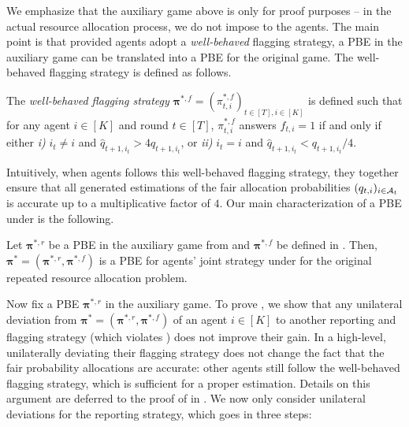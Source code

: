 We emphasize that the auxiliary game above is only for proof purposes -- in the actual resource allocation process, we do not impose  to the agents. The main point is that provided agents adopt a \textit{well-behaved} flagging strategy, a PBE in the auxiliary game can be translated into a PBE for the original game. The well-behaved flagging strategy is defined as follows.
\begin{definition}\label{def:well-behaved flagging}
The \textit{well-behaved flagging strategy} $\bm \pi^{\ast,f}=(\pi_{t,i}^{\ast,f})_{t\in [T],i\in [K]}$ is defined such that for any agent $i\in[K]$ and round $t\in[T]$, $\pi_{t,i}^{\ast,f}$ answers $f_{t,i}=1$ if and only if either \textit{i)} $i_t\neq i$ and $\hat q_{t+1,i_t}>4q_{t+1,i_t}$, or \textit{ii)} $i_t=i$ and $\hat q_{t+1,i_t}<q_{t+1,i_t}/4$.
\end{definition}

Intuitively, when agents follows this well-behaved flagging strategy, they together ensure that all generated estimations of the fair allocation probabilities $(q_{t,i})_{i\in \mathcal{A}_t}$ is accurate up to a multiplicative factor of $4$.
Our main characterization of a PBE under \mechname is the following.
\begin{theorem}\label{thm:equivalence of PBE}
Let ${\bm \pi}^{\ast,r}$ be a PBE in the auxiliary game from  and $\bm \pi^{\ast,f}$ be defined in . Then, $\bm \pi^\ast=({\bm \pi}^{\ast,r},{\bm \pi}^{\ast,f})$ is a PBE for agents' joint strategy under \mechname for the original repeated resource allocation problem.
\end{theorem}

Now fix a PBE $\bm\pi^{\ast,r}$ in the auxiliary game.
To prove , we show that any unilateral deviation from $\bm \pi^\ast=({\bm \pi}^{\ast,r},{\bm \pi}^{\ast,f})$ of an agent $i\in[K]$ to another reporting and flagging strategy (which violates ) does not improve their gain. In a high-level, unilaterally deviating their flagging strategy does not change the fact that the fair probability allocations are accurate: other agents still follow the well-behaved flagging strategy, which is sufficient for a proper estimation. Details on this argument are deferred to the proof of  in . We now only consider unilateral deviations for the reporting strategy, which goes in three steps:

